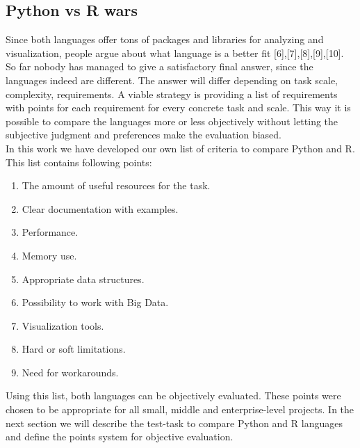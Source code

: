 \documentclass [twoside,
  11pt, a4paper,
  footinclude=true,
  headinclude=true,
  cleardoublepage=empty
]{article}
\begin{document}
\subsection{Python vs R wars}
Since both languages offer tons of packages and libraries for analyzing and visualization, people argue about what language is a better fit [6],[7],[8],[9],[10].
So far nobody has managed to give a satisfactory final answer, since the languages indeed are different. The answer will differ depending on task scale, complexity, requirements. A viable strategy is providing a list of requirements with points for each requirement for every concrete task and scale. This way it is possible to compare the languages more or less objectively without letting the subjective judgment and preferences make the evaluation biased.\\
In this work we have developed our own list of criteria to compare Python and R. This list contains following points:
\begin{enumerate}
    \item The amount of useful resources for the task.
    \item Clear documentation with examples.
    \item Performance.
    \item Memory use.
    \item Appropriate data structures.
    \item Possibility to work with Big Data.
    \item Visualization tools.
    \item Hard or soft limitations.
    \item Need for workarounds.
\end{enumerate}
Using this list, both languages can be objectively evaluated. These points were chosen to be appropriate for all small, middle and enterprise-level projects. In the next section we will describe the test-task to compare Python and R languages and define the points system for objective evaluation.\\
\end{document}
